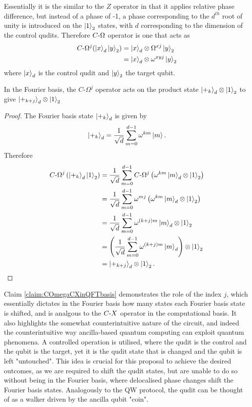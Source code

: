 Essentially it is the similar to the $Z$ operator in that it applies relative phase difference, but instead of a phase of -1, a phase corresponding to the $d^{th}$ root of unity is introduced on the $\ket{1}_2$ states, with $d$ corresponding to the dimension of the control qudits.
Therefore $C\text{-}\Omega$ operator is one that acts as
\begin{align}
    C\text{-}\Omega^j (\ket{x}_d\ket{y}_2) &= \ket{x}_d\otimes \Omega^{xj}\ket{y}_2\\
    & = \ket{x}_d\otimes \omega^{xyj}\ket{y}_2
\end{align}
where $\ket{x}_d$ is the control qudit and $\ket{y}_2$ the target qubit.

\begin{claim}
    \label{claim:COmegaCXinQFTbasis}
    In the Fourier basis, the $C\text{-}\Omega^j$ operator acts on the product state $\ket{+_k}_d\otimes\ket{1}_2$ to give $\ket{+_{k+j}}_d\otimes\ket{1}_2$
\end{claim}
\begin{proof}
    The Fourier basis state $\ket{+_k}_d$ is given by
    \begin{equation}
        \ket{+_k}_d = \frac{1}{\sqrt{d}}\sum_{m=0}^{d-1}\omega^{km}\ket{m}.
    \end{equation}
    Therefore
    \begin{align}
        C\text{-}\Omega^j\left(\ket{+_k}_d\ket{1}_2\right) 
        &= \frac{1}{\sqrt{d}}\sum_{m=0}^{d-1}C\text{-}\Omega^j\left(\omega^{km}\ket{m}_d\otimes\ket{1}_2\right)\\
        &= \frac{1}{\sqrt{d}}\sum_{m=0}^{d-1}\omega^{mj}\left(\omega^{km}\ket{m}_d\otimes\ket{1}_2\right)\\
        &= \frac{1}{\sqrt{d}}\sum_{m=0}^{d-1}\omega^{(k+j)m}\ket{m}_d\otimes\ket{1}_2\\
        &= \left(\frac{1}{\sqrt{d}}\sum_{m=0}^{d-1}\omega^{(k+j)m}\ket{m}_d\right)\otimes\ket{1}_2\\
        &= \ket{+_{k+j}}_d\otimes\ket{1}_2.
    \end{align}
\end{proof}

Claim \ref{claim:COmegaCXinQFTbasis} demonstrates the role of the index $j$, which essentially dictates in the Fourier basis how many states each Fourier basis state is shifted, and is analgous to the $C\text{-}X$ operator in the computational basis.
It also highlights the somewhat counterintuitive nature of the circuit, and indeed the counterintuitive way ancilla-based quantum computing can exploit quantum phenomena.
A controlled operation is utilised, where the qudit is the control and the qubit is the target, yet it is the qudit state that is changed and the qubit is left "untouched".
This idea is crucial for this proposal to achieve the desired outcomes, as we are required to shift the qudit states, but are unable to do so without being in the Fourier basis, where delocalised phase changes shift the Fourier basis states.
Analogously to the QW protocol, the qudit can be thought of as a walker driven by the ancilla qubit "coin".

